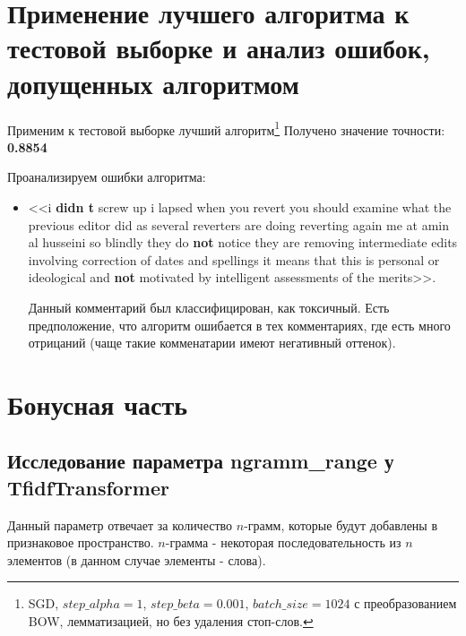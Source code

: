 \documentclass[a4paper, 11pt]{article}
\begin{document}
    \section{Применение лучшего алгоритма к тестовой выборке и анализ ошибок, допущенных алгоритмом}
        Применим к тестовой выборке лучший алгоритм\footnote{SGD, $step\_alpha = 1$, $step\_beta = 0.001$, $batch\_size = 1024$ с преобразованием BOW, лемматизацией, но без удаления стоп-слов.}
        Получено значение точности: \textbf{0.8854}
        
        Проанализируем ошибки алгоритма:
        \begin{itemize}
            \item <<i \textbf{didn t} screw up  i lapsed  when you revert  you should examine what the previous editor did  as several reverters are doing  reverting again me at amin al husseini so blindly they do \textbf{not} notice they are removing intermediate edits involving correction of dates and spellings  it means that this is personal  or ideological  and \textbf{not} motivated by intelligent assessments of the merits>>.
            
            Данный комментарий был классифицирован, как токсичный. Есть предположение, что алгоритм ошибается в тех комментариях, где есть много отрицаний (чаще такие комменатарии имеют негативный оттенок).
        \end{itemize}
    
    \section{Бонусная часть}
        \subsection{Исследование параметра \textbf{ngramm\_range} у TfidfTransformer}
            Данный параметр отвечает за количество $n$-грамм, которые будут добавлены в признаковое пространство. $n$-грамма - некоторая последовательность из $n$ элементов (в данном случае элементы - слова). 
            
\end{document}
